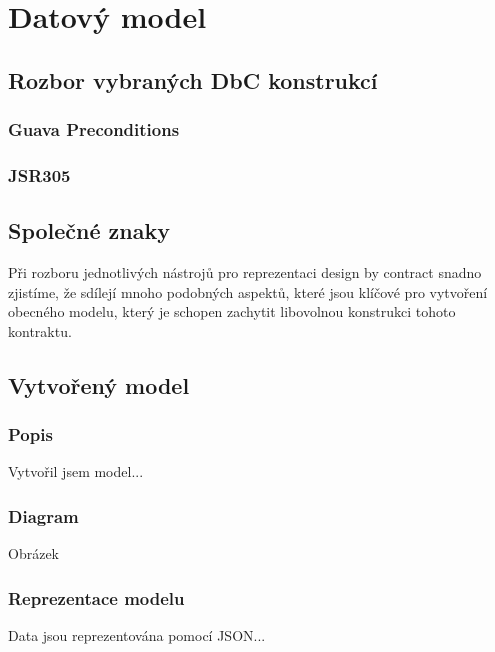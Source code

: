 \chapter{Datový model}
	\section{Rozbor vybraných DbC konstrukcí}
		\subsection{Guava Preconditions}
		
		\subsection{JSR305}
	
	\section{Společné znaky}		
		Při rozboru jednotlivých nástrojů pro reprezentaci design by contract snadno zjistíme, že sdílejí mnoho podobných aspektů, které jsou klíčové pro vytvoření obecného modelu, který je schopen zachytit libovolnou konstrukci tohoto kontraktu. 
	
	\section{Vytvořený model}
		\subsection{Popis}
			Vytvořil jsem model...
		
		\subsection{Diagram}
			Obrázek
			
		\subsection{Reprezentace modelu}
			Data jsou reprezentována pomocí JSON...